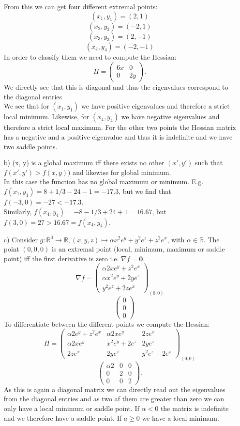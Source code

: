 \documentclass[10pt]{article}
\numberwithin{equation}{section}
\begin{document}
\begin{enumerate}
{From this we can get four different extremal points:
$$(x_1, y_1) = (2, 1)$$
$$(x_2, y_2) = (-2, 1) $$
$$(x_3, y_3) = (2, -1) $$
$$ (x_4, y_4) = (-2, -1) $$
In order to classify them we need to compute the Hessian: 
$$
H = \begin{pmatrix} 6x & 0 \\
0 & 2y \end{pmatrix}.
$$
We directly see that this is diagonal and thus the eigenvalues correspond to the diagonal entries \\
We see that  for $(x_1, y_1)$ we have positive eigenvalues and therefore a strict  local minimum. Likewise, for $(x_4, y_4)$ we have negative eigenvalues and therefore a strict local  maximum. For the other two points the Hessian matrix has a negative and a positive eigenvalue and thus it is indefinite and we have two saddle points.}
\item[b)] {
(x, y) is a global maximum iff there exists no other $(x', y')$ such that $f(x', y') > f(x, y))$ and likewise for global minimum. \\
In this case the function has no global maximum or minimum. E.g. $f(x_1, y_1) = 8 + 1/3 -24 -1 = -17.3$, but we find that $f(-3, 0) = -27 < -17.3$. \\
Similarly, $f(x_4, y_4) = -8 - 1/3 + 24 +1 = 16.67$, but $f(3, 0)= 27 > 16.67 = f(x_4, y_4)$. 
}
\item[c)] {
Consider $g: \mathbb{R}^3 \to \mathbb{R}, (x, y, z) \mapsto \alpha x^2e^y + y^2 e^z + z^2 e^x$, with $\alpha \in \mathbb{R}$. 
The point $(0, 0, 0)$ is an extremal point (local, minimum, maximum or saddle point) iff the first derivative is zero i.e. $\nabla f = \textbf{0}$.
$$
\nabla f = \begin{pmatrix} \alpha 2x e^y + z^2 e^x\\ \alpha x^2 e^y + 2y e^z \\ y^2 e^z + 2z e^x \end{pmatrix}_{(0, 0)}
$$
$$
= \begin{pmatrix} 0 \\ 0 \\ 0 \end{pmatrix}
$$
To differentiate between the different points we compute the Hessian:
$$
H = {\begin{pmatrix}
\alpha 2 e^y + z^2e^x & \alpha 2x e^y & 2z e^x \\
\alpha 2x e^y  & x^2 e^y + 2 e^z & 2ye^z \\
2z e^x & 2y e^z & y^2 e^z + 2 e^x
\end{pmatrix}}_{(0, 0)}
$$
$$
\begin{pmatrix}
\alpha 2   &  0& 0  \\
0  & 2 & 0 \\
0 & 0 &  2 
\end{pmatrix}.
$$
As this is again a diagonal matrix we can directly read out the eigenvalues from the diagonal entries and as two af them are greater than zero we can only have a local minimum or saddle point. If $\alpha <0$ the matrix is indefinite and we therefore have a saddle point. If $a\geq 0$ we have a local minimum. 
}
\end{enumerate}
\end{document}
